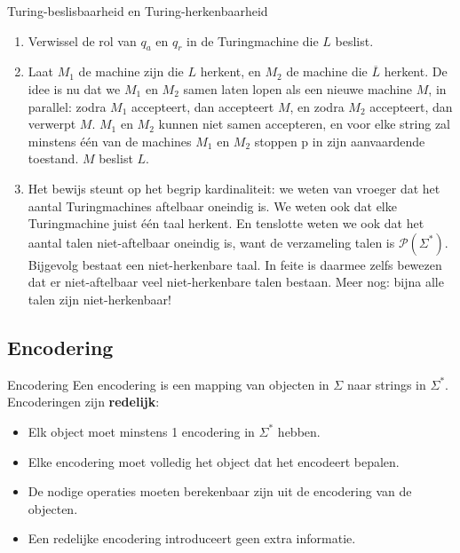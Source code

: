 \begin{prf}{Turing-beslisbaarheid en Turing-herkenbaarheid}
    \begin{enumerate}
        \item 
            Verwissel de rol van $q_a$ en $q_r$ in de Turingmachine die $L$ beslist.
        \item 
            Laat $M_1$ de machine zijn die $L$ herkent, en $M_2$ de machine die $\overline{L}$ herkent. De idee is nu dat we $M_1$ en $M_2$ samen laten lopen als een nieuwe machine $M$, in parallel: zodra $M_1$ accepteert, dan accepteert $M$, en zodra $M_2$ accepteert, dan verwerpt $M$. $M_1$ en $M_2$ kunnen niet samen accepteren, en voor elke string zal minstens één van de machines $M_1$ en $M_2$ stoppen p in zijn aanvaardende toestand. $M$ beslist $L$.
        \item 
            Het bewijs steunt op het begrip kardinaliteit: we weten van vroeger dat het aantal Turingmachines aftelbaar oneindig is. We weten ook dat elke Turingmachine juist één taal herkent. En tenslotte weten we ook dat het aantal talen niet-aftelbaar oneindig is, want de verzameling talen is $\mathcal{P}(\Sigma^*)$. Bijgevolg bestaat een niet-herkenbare taal. In feite is daarmee zelfs bewezen dat er niet-aftelbaar veel niet-herkenbare talen bestaan. Meer nog: bijna alle talen zijn niet-herkenbaar!
    \end{enumerate}
\end{prf}

\subsection{Encodering}

\vspace{0.5cm}

\begin{theo}[Encodering]{Encodering}
    Een encodering is een mapping van objecten in $\Sigma$ naar strings in $\Sigma^*$. Encoderingen zijn \textbf{redelijk}:
    \begin{itemize}
        \item Elk object moet minstens 1 encodering in $\Sigma^*$ hebben.
        \item Elke encodering moet volledig het object dat het encodeert bepalen.
        \item De nodige operaties moeten berekenbaar zijn uit de encodering van de objecten.
        \item Een redelijke encodering introduceert geen extra informatie.
    \end{itemize}
\end{theo}

